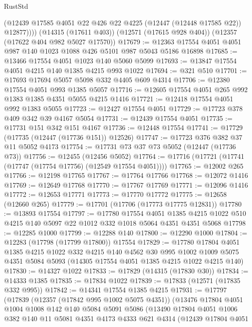 \begin{lexlean}{RustStd}
\begin{coremodule}
          (@12439 @17585 @4051 @22 @426 @22 @4225 (@12447 (@12448 @17585 @22)) @12877))))
    (@14315 (@17611 @403))
    (@12571 (@17615 @928 @404))
    (@12357 (@17622 @404 @982 @5027 @17570))
@17679 := @12363 @17554 @4051 @4051 @987 @140 @1023 @1088 @426 @5101 @987 @5043 @5186 @16898
@17685 := @13466 @17554 @4051 @1023 @140 @5060 @5099
@17693 := @13847 @17554 @4051 @4215 @140 @1385 @4215 @993 @1022
@17694 := @321 @510
@17701 := @17693 @17694 @5057 @5098 @332 @4405 @609 @4314
@17706 := @12380 @17554 @4051 @993 @1385 @5057
@17716 := @12605 @17554 @4051 @265 @992 @1383 @1385 @4351 @5055 @4215 @1416
@17721 := @12418 @17554 @4051 @992 @1383 @5055
@17723 := @12427 @17554 @4051
@17729 := @17723 @378 @409 @342 @39 @4167 @5054
@17731 := @12439 @17554 @4051
@17735 := @17731 @151 @342 @151 @4167
@17736 := @12448 @17554
@17741 := @17729 (@17735 (@12447 (@17736 @151)) @12526)
@17747 := @17723 @376 @382 @37 @11 @5052 @4173
@17754 := @17731 @73 @37 @73 @5052 (@12447 (@17736 @73))
@17756 := @12455 (@12456 @5052)
@17764 := @17716 (@17721 (@17741 (@17747 (@17754 @17756) (@12549 @17554 @4051))))
@17765 := @12002 @265
@17766 := @12198 @17765
@17767 := @17764 @17766
@17768 := @12072 @1416
@17769 := @12649 @17768
@17770 := @17767 @17769
@17771 := @12096 @1416
@17772 := @12653 @17771
@17773 := @17770 @17772
@17775 := @12658 (@12660 @265)
@17779 := @17701 (@17706 (@17773 @17775 @12831))
@17780 := @13893 @17554
@17797 := @17780
    @17554
    @4051
    @1385
    @4215
    @1022
    @510
    @4215
    @140
    @5097
    @22
    @1012
    @332
    @1018
    @5064
    @4351
    @4351
    @5068
@17798 := @12285 @1000
@17799 := @12288 @140
@17800 := @12290 @1000
@17804 := @12283 (@17798 (@17799 @17800)) @17554
@17829 := @17780
    @17804
    @4051
    @1385
    @4215
    @1022
    @332
    @4215
    @140
    @4562
    @30
    @995
    @1002
    @1009
    @5075
    @4351
    @5084
    @5093
    (@14305 @17554 @4051 @1385 @4215 @1022 @4215 @140)
@17830 := @14327 @1022
@17833 := @17829 (@14315 (@17830 @30))
@17834 := @14333 @1385
@17835 := @17834 @1022
@17839 := @17833 (@12571 (@17835 @332 @995))
@17842 := @14341 @17554 @1385 @4215
@17931 := @17797
    (@17839
      (@12357 (@17842 @995 @1002 @5075 @4351))
      (@13476
        @17804
        @4051
        @1004
        @1008
        @142
        @140
        @5084
        @5091
        @5086
        (@13490
          @17804
          @4051
          @1006
          @382
          @140
          @11
          @5081
          @4351
          @4173
          @4333
          @621
          @4314
          (@12439
            @17804
            @4051

\end{coremodule}
\end{lexlean}
